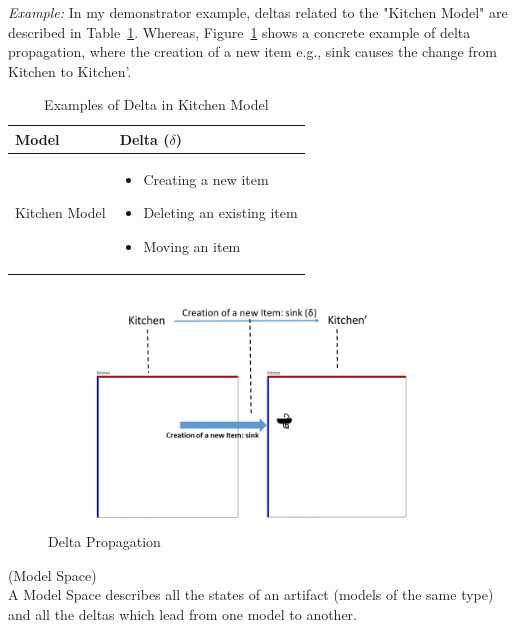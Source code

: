 \textit{Example:} In my demonstrator example, deltas related to the "Kitchen Model" are described in Table~\ref{tab:Examples_of_Delta}. Whereas, Figure~\ref{fig:Delta_Propagation} shows a concrete example of delta propagation, where the creation of a new item e.g., sink causes the change from Kitchen to Kitchen'.\\

\begin{table}
	\centering	
	\begin{tabular}{|p{4cm}|p{8cm}|}
		\hline
		\rowcolor[gray]{.8}	
		\textbf{Model} & \textbf{Delta ($\delta$)} \\
		\hline
		Kitchen Model & 
		\begin{itemize}
			\item Creating a new item
			\item Deleting an existing item
			\item Moving an item
		\end{itemize}\\
		\hline				
		
	\end{tabular}
	\caption{Examples of Delta in Kitchen Model}
	\label{tab:Examples_of_Delta}
\end{table}

\begin{figure}
	\centering
	\includegraphics[width=1\textwidth]{figures/Delta_Propagation}
	\caption{Delta Propagation}
	\label{fig:Delta_Propagation}
\end{figure}

\begin{defn}\label{defModelSpace } (Model Space)\\
A Model Space describes all the states of an artifact (models of the same type) and all the deltas which lead from one model to another.
\end{defn}

